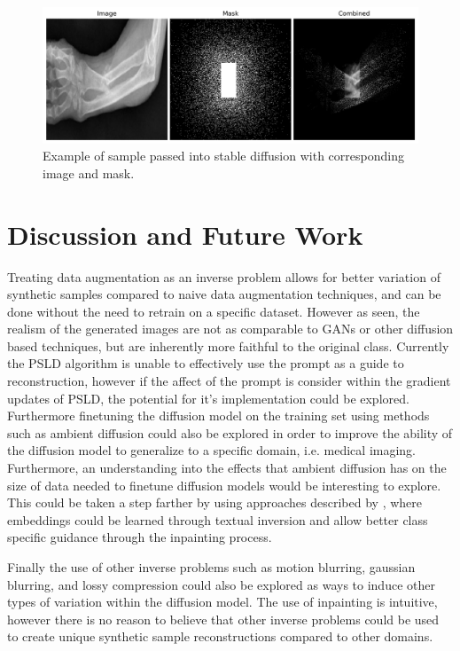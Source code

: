 \documentclass{article}
\begin{document}
\begin{figure}[ht]
    \vskip -0.1in
    \begin{center}
        \centerline{\includegraphics[width=\columnwidth]{Mask.png}}
        \caption{Example of sample passed into stable diffusion with corresponding image and mask.}
        \label{training_curves}
    \end{center}
    \vskip -0.3in
\end{figure}


\section{Discussion and Future Work}

Treating data augmentation as an inverse problem allows for better variation of synthetic samples compared to naive data augmentation techniques, and can be done
without the need to retrain on a specific dataset. However as seen, the realism of the generated images are not as comparable to GANs or other diffusion based techniques,
but are inherently more faithful to the original class. Currently the PSLD algorithm is unable to effectively use the prompt as a guide to reconstruction, however if the 
affect of the prompt is consider within the gradient updates of PSLD, the potential for it's implementation could be explored. Furthermore finetuning the diffusion model on
the training set using methods such as ambient diffusion \cite{2305.19256} could also be explored in order to improve the ability of the diffusion model to generalize to 
a specific domain, i.e. medical imaging. Furthermore, an understanding into the effects that ambient diffusion has on the size of data needed to finetune diffusion models
would be interesting to explore. This could be taken a step farther by using approaches described by \cite{2302.07944}, where embeddings could be learned through
textual inversion and allow better class specific guidance through the inpainting process. 

Finally the use of other inverse problems such as motion blurring, gaussian blurring, and lossy compression could also be explored as ways to induce other types of variation
within the diffusion model. The use of inpainting is intuitive, however there is no reason to believe that other inverse problems could be used to create unique synthetic
sample reconstructions compared to other domains. 
\end{document}
